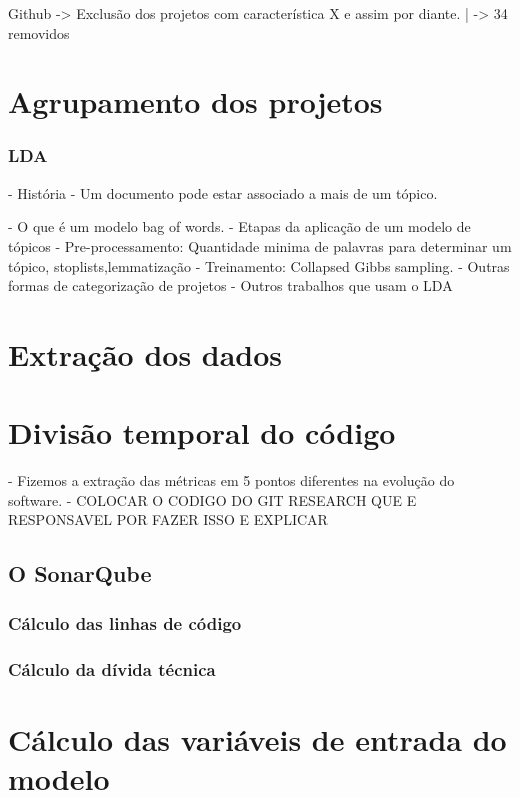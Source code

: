 Github -> Exclusão dos projetos com característica X  e assim por diante.
                                   |
                                   -> 34 removidos 



\section{Agrupamento dos projetos}

\subsubsection{LDA}

- História
- Um documento pode estar associado a mais de um tópico.

- O que é um modelo bag of words.
- Etapas da aplicação de um modelo de tópicos
	- Pre-processamento:  Quantidade minima de palavras para determinar um tópico, stoplists,lemmatização
	- Treinamento: Collapsed  Gibbs sampling.
- Outras formas de categorização de projetos
- Outros trabalhos que usam o LDA	
 


\section{Extração dos dados}

\section{Divisão temporal do código}
 - Fizemos a extração das métricas em 5 pontos diferentes na evolução do software.
 - COLOCAR O CODIGO DO GIT RESEARCH QUE E RESPONSAVEL POR FAZER ISSO E EXPLICAR

\subsection{O SonarQube}
\subsubsection{Cálculo das linhas de código}
\subsubsection{Cálculo da dívida técnica}





\section{Cálculo das variáveis de entrada do modelo}

